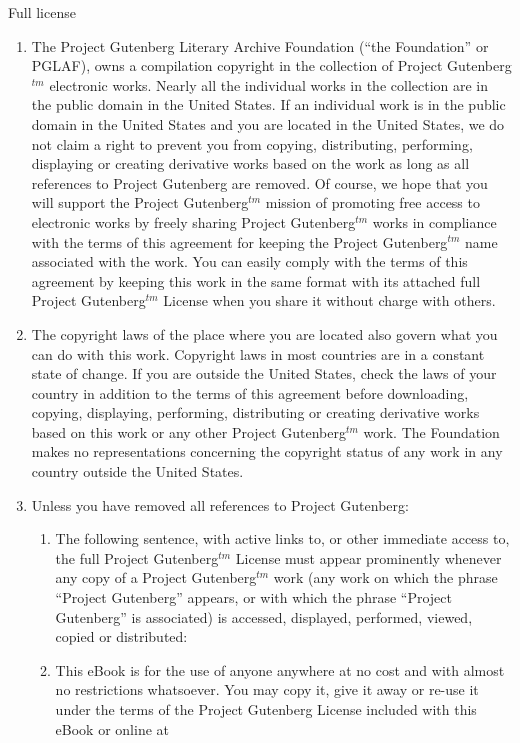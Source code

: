 \begin{chapter}{Full license}
\begin{enumerate}
\item \label{1C}The Project Gutenberg Literary Archive Foundation (``the
Foundation'' or PGLAF), owns a compilation copyright in the collection of Project
Gutenberg$^{tm}$ electronic works.  Nearly all the individual works in the
collection are in the public domain in the United States.  If an
individual work is in the public domain in the United States and you are
located in the United States, we do not claim a right to prevent you from
copying, distributing, performing, displaying or creating derivative
works based on the work as long as all references to Project Gutenberg
are removed.  Of course, we hope that you will support the Project
Gutenberg$^{tm}$ mission of promoting free access to electronic works by
freely sharing Project Gutenberg$^{tm}$ works in compliance with the terms of
this agreement for keeping the Project Gutenberg$^{tm}$ name associated with
the work.  You can easily comply with the terms of this agreement by
keeping this work in the same format with its attached full Project
Gutenberg$^{tm}$ License when you share it without charge with others.

\item The copyright laws of the place where you are located also govern
what you can do with this work.  Copyright laws in most countries are in
a constant state of change.  If you are outside the United States, check
the laws of your country in addition to the terms of this agreement
before downloading, copying, displaying, performing, distributing or
creating derivative works based on this work or any other Project
Gutenberg$^{tm}$ work.  The Foundation makes no representations concerning
the copyright status of any work in any country outside the United
States.

\item \label{1E}Unless you have removed all references to Project Gutenberg:
\begin{enumerate}
  
\item \label{1E1}The following sentence, with active links to, or other
immediate access to, the full Project Gutenberg$^{tm}$ License must appear prominently
whenever any copy of a Project Gutenberg$^{tm}$ work (any work on which the
phrase ``Project Gutenberg'' appears, or with which the phrase ``Project
Gutenberg'' is associated) is accessed, displayed, performed, viewed,
copied or distributed:

\item This eBook is for the use of anyone anywhere at no cost and with
almost no restrictions whatsoever.  You may copy it, give it away or
re-use it under the terms of the Project Gutenberg License included
with this eBook or online at 


\end{enumerate}
\end{enumerate}
\end{chapter}
